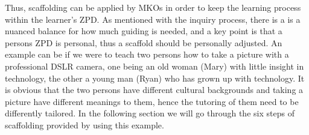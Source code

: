 Thus, scaffolding can be applied by MKOs in order to keep the learning process within the learner’s ZPD. As mentioned with the inquiry process, there is a is a nuanced balance for how much guiding is needed, and a key point is that a persons ZPD is personal, thus a scaffold should be personally adjusted. An example can be if we were to teach two persons how to take a picture with a professional DSLR camera, one being an old woman (Mary) with little insight in technology, the other a young man (Ryan) who has grown up with technology. It is obvious that the two persons have different cultural backgrounds and taking a picture have different meanings to them, hence the tutoring of them need to be differently tailored. In the following section we will go through the six steps of scaffolding provided by \citet{wood1976role} using this example.


